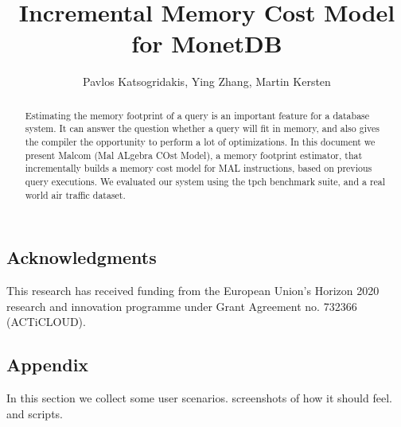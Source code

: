 \documentclass{vldb}
\begin{document}
\title{Incremental Memory Cost Model for MonetDB}

\author{Pavlos Katsogridakis, Ying Zhang, Martin Kersten}

\maketitle

\begin{abstract}
Estimating the memory footprint of a query is an important
feature for a database system. It can answer the question whether
a query will fit in memory, and also gives the compiler the opportunity
to perform a lot of optimizations.
In this document we present Malcom (Mal ALgebra COst Model), a memory footprint
estimator, that incrementally builds a memory cost model for MAL instructions,
based on previous query executions. We evaluated our system using the tpch
benchmark suite, and a real world air traffic dataset.
\end{abstract}






\subsection*{Acknowledgments}
This research has received funding from the European Union’s Horizon 2020 research and innovation programme under Grant Agreement no. 732366 (ACTiCLOUD).

{\small


}
\subsection*{Appendix}
In this section we collect some user scenarios. screenshots of how it should feel.
and scripts.
\end{document}

